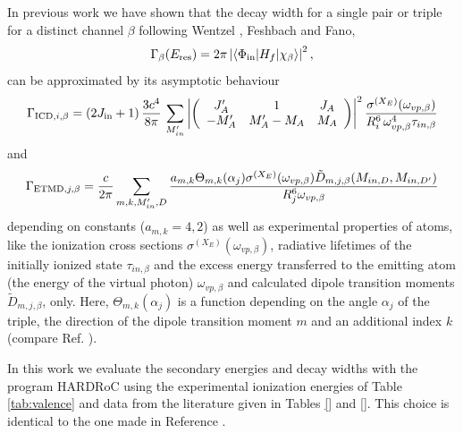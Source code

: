 In previous work \cite{Fasshauer13,Fasshauer_thesis} we have shown that
the decay width for a single pair or triple for a distinct channel $\beta$
following Wentzel \cite{Wentzel27}, Feshbach\cite{Feshbach58,Feshbach62}
and Fano,\cite{Fano61}
%
\begin{equation}
 \Gamma_{\beta}(E_{\rm res}) = 2\pi \left|
                           \braket{\Phi_{\rm in}| H_f |\chi_{\beta}}
                           \right|^2,
\end{equation}
%
can be approximated by its asymptotic behaviour
%
\begin{equation}
 \Gamma_{{\rm ICD},i,\beta} = (2J_{\rm in}+1)\, \frac{3c^4}{8\pi}\,
                        \sum\limits_{M_{in}'}
                        \left| \left(
                        \begin{array}{ccc}
                        J_A'  & 1        & J_A\\
                        -M_A' & M_A'-M_A & M_A
                        \end{array}\right) \right|^2
                        \frac{\sigma^{(X_E)}(\omega_{vp,\beta})}
                        {R_i^6 \, \omega_{vp,\beta}^4 \tau_{in,\beta}}
\end{equation}
%
and
%
\begin{equation}
 \Gamma_{{\rm ETMD},j,\beta} = \frac{c}{2\pi} \sum\limits_{m,k,M_{in}',D}
                        \frac{a_{m,k} \Theta_{m,k}(\alpha_j) \sigma^{(X_E)}(\omega_{vp,\beta})
                              \tilde{D}_{m,j,\beta}(M_{in,D},M_{in,D'})}
                         {R_j^6 \omega_{vp,\beta}}
\end{equation}
%
depending on constants ($a_{m,k}=4,2$)
as well as experimental properties
of atoms, like the ionization cross sections
$\sigma^{(X_E)}(\omega_{vp,\beta})$, radiative lifetimes of the initially
ionized state $\tau_{in,\beta}$ and the excess energy transferred to the
emitting atom (the energy of the virtual photon) $\omega_{vp,\beta}$
and calculated dipole transition moments $\tilde{D}_{m,j,\beta}$, only.
Here, $\Theta_{m,k}(\alpha_j)$ is a function depending on the angle $\alpha_j$
of the triple, the direction of the dipole
transition moment $m$ and an additional index $k$
(compare Ref. \cite{Fasshauer13}).

In this work we evaluate the secondary energies and decay widths with
the program HARDRoC \cite{HARDRoC,fasshauer2014} using the
experimental ionization energies of Table \ref{tab:valence}
and data from the literature given in Tables \ref{} and \ref{}.
This choice is identical to the one made in Reference \cite{Fasshauer13}.
